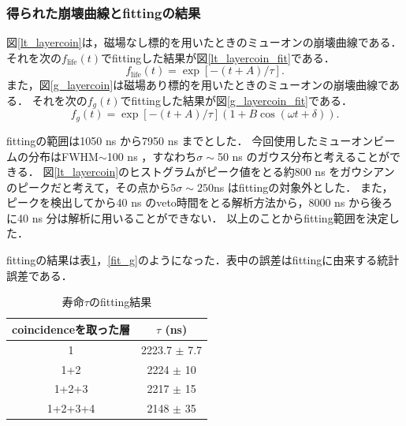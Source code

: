   \subsubsection{得られた崩壊曲線とfittingの結果}
  図\ref{lt_layercoin}は，磁場なし標的を用いたときのミューオンの崩壊曲線である．
  それを次の$f_{\mathrm{life}}(t)$でfittingした結果が図\ref{lt_layercoin_fit}である．
  \begin{equation*}
   f_{\mathrm{life}}(t) = \exp[-(t+A)/\tau].
  \end{equation*}
  また，図\ref{g_layercoin}は磁場あり標的を用いたときのミューオンの崩壊曲線である．
  それを次の$f_{g}(t)$でfittingした結果が図\ref{g_layercoin_fit}である．
  \begin{equation*}
   f_{g}(t) = \exp[-(t+A)/\tau](1+B\cos(\omega t + \delta)).
  \end{equation*}
  
  fittingの範囲は1050 ns から7950 ns までとした． 
  今回使用したミューオンビームの分布はFWHM$\sim$100 ns ，すなわち$\sigma\sim$50 ns のガウス分布と考えることができる．
  図\ref{lt_layercoin}のヒストグラムがピーク値をとる約800 ns をガウシアンのピークだと考えて，その点から$5\sigma\sim 250$ns はfittingの対象外とした．
  また，ピークを検出してから40 ns のveto時間をとる解析方法から，8000 ns から後ろに40 ns 分は解析に用いることができない．
  以上のことからfitting範囲を決定した．
  
  fittingの結果は表\ref{fit_lt}，\ref{fit_g}のようになった．表中の誤差はfittingに由来する統計誤差である．
  
  \begin{table}[H]
   \caption{寿命$\tau$のfitting結果}
   \label{fit_lt}
   \begin{center}
    \begin{tabular}{cc}\toprule
     coincidenceを取った層& $\tau$ (ns) \\ \midrule
     1 		        & 2223.7 $\pm$ 7.7 \\
     1+2 		& 2224 $\pm$ 10 \\
     1+2+3 		& 2217 $\pm$ 15 \\
     1+2+3+4 		& 2148 $\pm$ 35\\ \bottomrule
    \end{tabular}
   \end{center}
  \end{table}%
  
